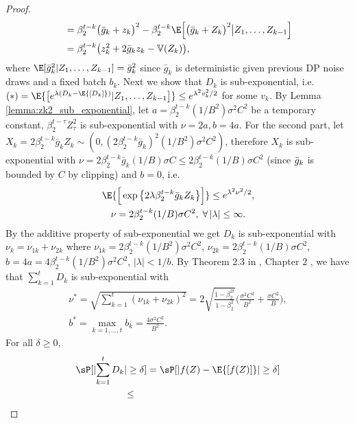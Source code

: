 \documentclass[letterpaper]{article} %
\def\V{\mathbb{V}}
\begin{document}
\begin{proof}
\begin{align*}
    &= \beta_{2}^{t-k} \big(\bar{g}_k + z_k\big)^{2} - \beta_2^{t-k}\E\Big[\big(\bar{g}_k + Z_k\big)^{2} \big\vert Z_1, \ldots, Z_{k-1}\Big] \\
    &= \beta_{2}^{t-k}\big(z_k^2 + 2\bar{g}_k z_k - \V(Z_k)\big),
\end{align*}
where $\E[\bar{g}_k^2 | Z_1, \ldots, Z_{k-1}] = \bar{g}_k^2$ since $\bar{g}_k$ is deterministic given previous DP noise draws and a fixed batch $b_k$.
Next we show that $D_k$ is sub-exponential, i.e. $(*) = \E{\big[ e^{\lambda (D_k - \E{[D_k]})} | Z_1, \ldots, Z_{k-1}\big]} \leq e^{\lambda^2 v_k^2/2}$ for some $v_k$.
By Lemma \ref{lemma:zk2_sub_exponential}, let $a=\beta_{2}^{t-k}(1/B^2)\sigma^2C^2$ be a temporary constant, $\beta_2^{t-\tau}Z_\tau^2$ is sub-exponential with $\nu=2a, b=4a$.
For the second part, let $X_k = 2 \beta_{2}^{t-k}\bar{g}_k Z_k \sim (0, (2 \beta_{2}^{t-k}\bar{g}_k)^2 (1/B^2) \sigma^2 C^2)$, therefore $X_k$ is sub-exponential with $\nu = 2 \beta_{2}^{t-k}\bar{g}_k (1/B) \sigma C \leq 2 \beta_{2}^{t-k} (1/B) \sigma C^2$ (since $\Bar{g}_k$ is bounded by $C$ by clipping) and $b=0$, i.e.
\begin{gather*}
    \E{\Big[ \exp{\bigl\{ 2\lambda \beta_{2}^{t-k}\bar{g}_k Z_k \bigl\} }\Big]} \leq e^{\lambda^2 \nu^2 / 2}, \\
    \nu = 2 \beta_{2}^{t-k}(1/B)\sigma C^2, \; \forall \, |\lambda| \leq \infty.
\end{gather*}
By the additive property of sub-exponential we get $D_k$ is sub-exponential with $\nu_k = \nu_{1k} + \nu_{2k}$ where $\nu_{1k} = 2\beta_{2}^{t-k}(1/B^2)\sigma^2C^2$, $\nu_{2k} = 2 \beta_{2}^{t-k} (1/B)\sigma C^2$, $b = 4a = 4\beta_{2}^{t-k}(1/B^2)\sigma^2C^2$, $|\lambda| < 1/b$.
%
By Theorem 2.3 in \cite{wainwright2019high}, Chapter 2 , we have that $\sum_{k=1}^{t} D_k$ is sub-exponential with
\begin{gather*}
    \nu^{*} = \sqrt{\sum_{k=1}^{t} (\nu_{1k} + \nu_{2k})^2} = 2\sqrt{\frac{1-\beta_2^{2t}}{1-\beta_2^2}}\bigg( \frac{\sigma^2C^2}{B^2} + \frac{\sigma C^2}{B} \bigg), \\
    b^{*} = \max_{k=1, \ldots, t} b_k = \frac{4\sigma^2C^2}{B^2}.
\end{gather*}
For all $\delta \geq 0$,
\begin{align*}
    \sP[\lvert \sum_{k=1}^{t} D_k &\rvert \geq \delta] = \sP[\lvert f(Z) - \E{[f(Z)]} \rvert \geq \delta] \\ &\leq

\end{align*}
\end{proof}
\end{document}
